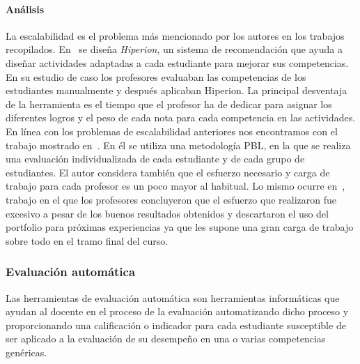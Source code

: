 \paragraph*{Análisis}
La escalabilidad es el problema más mencionado por los autores en los trabajos recopilados. En~\cite{serrano2013hiperion} se diseña \emph{Hiperion}, un sistema de recomendación que ayuda a diseñar actividades adaptadas a cada estudiante para mejorar sus competencias. En su estudio de caso los profesores evaluaban las competencias de los estudiantes manualmente y después aplicaban Hiperion. La principal desventaja de la herramienta es el tiempo que el profesor ha de dedicar para asignar los diferentes logros y el peso de cada nota para cada competencia en las actividades. En línea con los problemas de escalabilidad anteriores nos encontramos con el trabajo mostrado en~\cite{lacuesta2009active}. En él se utiliza una metodología PBL, en la que se realiza una evaluación individualizada de cada estudiante y de cada grupo de estudiantes. El autor considera también que el esfuerzo necesario y carga de trabajo para cada profesor es un poco mayor al habitual. Lo mismo ocurre en~\cite{benlloch2007adapting}, trabajo en el que los profesores concluyeron que el esfuerzo que realizaron fue excesivo a pesar de los buenos resultados obtenidos y descartaron el uso del portfolio para próximas experiencias ya que les supone una gran carga de trabajo sobre todo en el tramo final del curso.

\subsubsection{Evaluación automática}

Las herramientas de evaluación automática son herramientas informáticas que ayudan al docente en el proceso de la evaluación automatizando dicho proceso y proporcionando una calificación o indicador para cada estudiante susceptible de ser aplicado a la evaluación de su desempeño en una o varias competencias genéricas. %

